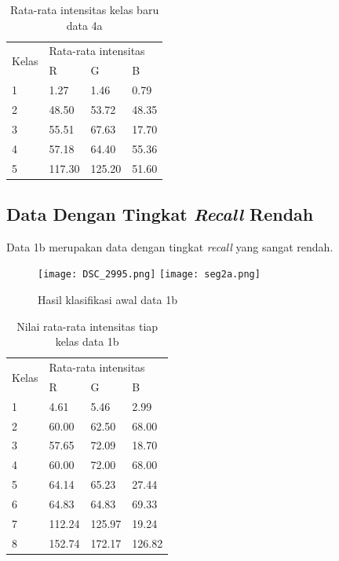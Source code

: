 \documentclass[laporan.tex]{subfiles}
\begin{document}
\begin{table}[h!]
\centering
\begin{tabular}{|l|l|l|l|}
\cline{1-4}
\multirow{2}{*}{Kelas} & \multicolumn{3}{l|}{Rata-rata intensitas} \\
\cline{2-4}
 & R & G & B \\
\cline{1-4}
1 & 1.27 & 1.46 & 0.79 \\
2 & 48.50 & 53.72 & 48.35 \\
3 & 55.51 & 67.63 & 17.70 \\
4 & 57.18 & 64.40 & 55.36 \\
5 & 117.30 & 125.20 & 51.60 \\
\cline{1-4}
\end{tabular}
\caption[]{Rata-rata intensitas kelas baru data 4a}
\label{table:avggreen2}
\end{table}

\FloatBarrier
\subsection{Data Dengan Tingkat \emph{Recall} Rendah}

Data 1b merupakan data dengan tingkat \emph{recall} yang sangat rendah.

\begin{figure}[h!]
\centering
\texttt{[image: DSC\_2995.png]}
\texttt{[image: seg2a.png]}
\caption[]{Hasil klasifikasi awal data 1b}
\end{figure}

\begin{table}[h!]
\centering
\begin{tabular}{|l|l|l|l|}
\cline{1-4}
\multirow{2}{*}{Kelas} & \multicolumn{3}{l|}{Rata-rata intensitas} \\
\cline{2-4}
 & R & G & B \\
\cline{1-4}
1 & 4.61 & 5.46 & 2.99 \\
2 & 60.00 & 62.50 & 68.00 \\
3 & 57.65 & 72.09 & 18.70 \\
4 & 60.00 & 72.00 & 68.00 \\
5 & 64.14 & 65.23 & 27.44 \\
6 & 64.83 & 64.83 & 69.33 \\
7 & 112.24 & 125.97 & 19.24 \\
8 & 152.74 & 172.17 & 126.82 \\
\cline{1-4}
\end{tabular}
\caption[]{Nilai rata-rata intensitas tiap kelas data 1b}
\end{table}
\end{document}
